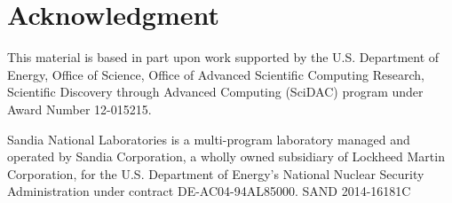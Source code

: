 \documentclass{llncs}
\begin{document}
\section*{Acknowledgment}

\noindent
This material is based in part upon work supported by the U.S. Department
of Energy, Office of Science, Office of Advanced Scientific Computing
Research, Scientific Discovery through Advanced Computing (SciDAC) program
under Award Number 12-015215.

Sandia National Laboratories is a multi-program laboratory managed and
operated by Sandia Corporation, a wholly owned subsidiary of Lockheed
Martin Corporation, for the U.S. Department of Energy's National Nuclear
Security Administration under contract DE-AC04-94AL85000. \hfill
{\footnotesize SAND 2014-16181C}



\end{document}
